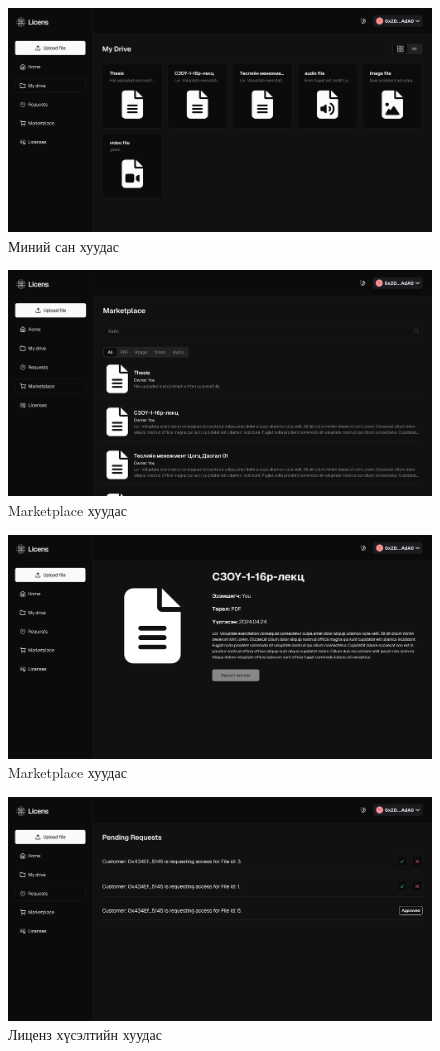 \begin{figure}[h!]
	\centering
	\includegraphics[scale=0.16]{src/images/drive.png}
	\caption{Миний сан хуудас}
\end{figure}

\begin{figure}[h!]
	\centering
	\includegraphics[scale=0.16]{src/images/marketplace.png}
	\caption{Marketplace хуудас}
\end{figure}

\begin{figure}[h!]
	\centering
	\includegraphics[scale=0.16]{src/images/marketplace-file.png}
	\caption{Marketplace хуудас}
\end{figure}

\begin{figure}[h!]
	\centering
	\includegraphics[scale=0.16]{src/images/requests.png}
	\caption{Лиценз хүсэлтийн  хуудас}
\end{figure}